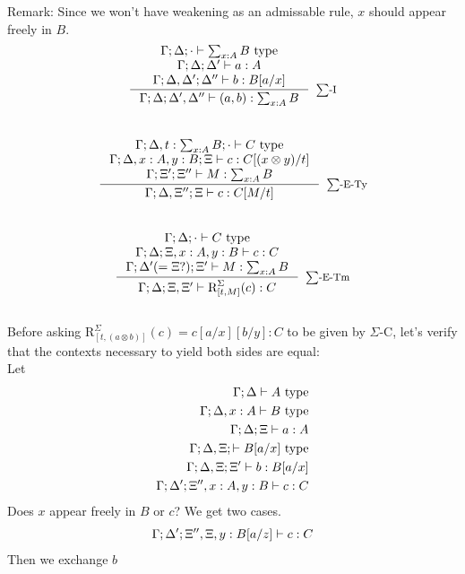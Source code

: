 Remark: Since we won't have weakening as an admissable rule, $x$ should appear freely in $B$.
\[
\begin{split}
  \inference {
    \Gamma; \Delta; \cdot \vdash \sum_{x : A}B \text{ type}\\
    \Gamma; \Delta; \Delta' \vdash a : A\\
    \Gamma; \Delta, \Delta'; \Delta'' \vdash b : B[a/x]\\
}
           {\Gamma; \Delta; \Delta', \Delta'' \vdash (a, b) : \sum_{x : A}B}[$\sum$-I]
\end{split}
\]\\
\[
\begin{split}
\inference {\Gamma; \Delta, t: \sum_{x : A}B; \cdot \vdash C \text{ type}\\
\Gamma;  \Delta, x: A, y: B; \Xi \vdash c : C[(x \otimes y)/t]\\
\Gamma;    \Xi'; \Xi'' \vdash M: \sum_{x : A}B\\
}
           {\Gamma; \Delta, \Xi''; \Xi \vdash c : C[M/t]
           }[$\sum$-E-Ty]
\end{split}
\]\\
\[
\begin{split}
\inference {\Gamma; \Delta; \cdot \vdash C \text{ type}\\
\Gamma;  \Delta; \Xi, x: A, y: B \vdash c : C\\
\Gamma;    \Delta' (= \Xi?); \Xi' \vdash M: \sum_{x : A}B\\
}
           {\Gamma; \Delta; \Xi, \Xi' \vdash \text{R}^{\Sigma}_{[t, M]}(c) : C
           }[$\sum$-E-Tm]
\end{split}
\]\\
Before asking $\text{R}^{\Sigma}_{[t, (a \otimes b)]}(c) = c[a/x][b/y] : C$ to be given by $\Sigma$-C, let's verify that the contexts necessary to yield both sides are equal:\\
Let
\[
\begin{split}
\Gamma; \Delta \vdash A \text{ type}\\
\Gamma; \Delta, x : A \vdash B \text{ type}\\
\Gamma; \Delta; \Xi \vdash a : A\\
\Gamma; \Delta, \Xi; \vdash B[a/x] \text{ type}\\
\Gamma; \Delta, \Xi; \Xi' \vdash b : B[a/x]\\
\Gamma; \Delta'; \Xi'', x : A, y : B \vdash c : C\\
\end{split}
\]
Does $x$ appear freely in $B$ or $c$? We get two cases.
\[
\begin{split}
\Gamma; \Delta'; \Xi'', \Xi, y : B[a/z] \vdash c : C\\
\end{split}
\]
Then we exchange $b$
\\
